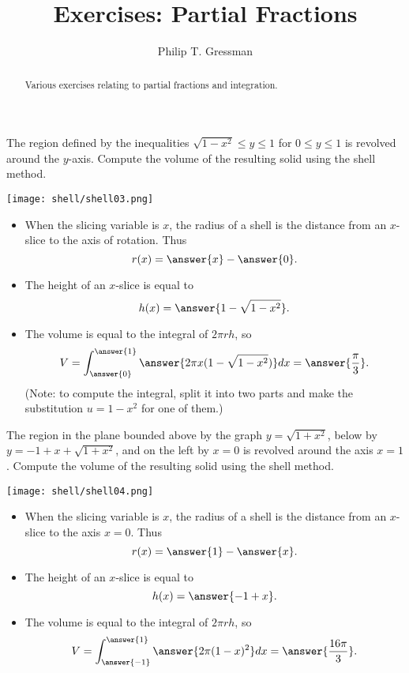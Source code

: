 \documentclass{ximera}
\title{Exercises: Partial Fractions}
\author{Philip T. Gressman}
\begin{document}
\begin{abstract}
Various exercises relating to partial fractions and integration.
\end{abstract}
\maketitle

\begin{exercise}
The region defined by the inequalities $\sqrt{1-x^2} \leq y \leq 1$ for $0 \leq y \leq 1$ is revolved around the $y$-axis. Compute the volume of the resulting solid using the shell method.
\begin{center}
\begin{image}
\texttt{[image: shell/shell03.png]}
\end{image}
\end{center}
\begin{itemize}
\item When the slicing variable is $x$, the radius of a shell is the  distance from an $x$-slice to the axis of rotation. Thus
\[ r(x) = \answer{x} - \answer{0}. \]
\item The height of an $x$-slice is equal to
\[ h(x) = \answer{1 - \sqrt{1 - x^2}}. \]
\item The volume is equal to the integral of $2 \pi r h$, so 
\[ V = \int_{\answer{0}}^{\answer{1}} \answer{2 \pi x ( 1 - \sqrt{1-x^2}) } dx = \answer{\frac{\pi}{3}}. \]
(Note: to compute the integral, split it into two parts and make the substitution $u = 1-x^2$ for one of them.)
\end{itemize}
\end{exercise}

\begin{exercise}
The region in the plane bounded above by the graph $y = \sqrt{1+x^2}$, below by $y = -1 + x + \sqrt{1+x^2}$, and on the left by $x = 0$ is revolved around the axis $x = 1$. Compute the volume of the resulting solid using the shell method.
\begin{center}
\begin{image}
\texttt{[image: shell/shell04.png]}
\end{image}
\end{center}
\begin{itemize}
\item When the slicing variable is $x$, the radius of a shell is the  distance from an $x$-slice to the axis $x = 0$. Thus
\[ r(x) = \answer{1} - \answer{x}. \]
\item The height of an $x$-slice is equal to
\[ h(x) = \answer{-1+x}. \]
\item The volume is equal to the integral of $2 \pi r h$, so 
\[ V = \int_{\answer{-1}}^{\answer{1}} \answer{2 \pi (1-x)^2 } dx = \answer{\frac{16\pi}{3}}. \]
\end{itemize}
\end{exercise}
\end{document}
